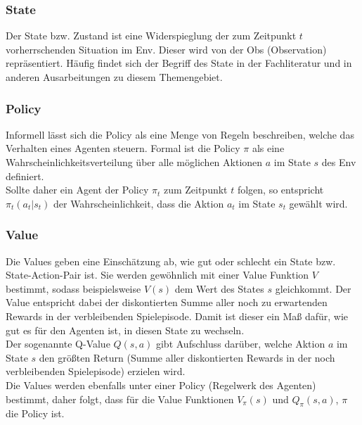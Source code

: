 \subsubsection{State} \label{subsubsec:Grundlagen_State}
Der State bzw. Zustand ist eine Widerspieglung der zum Zeitpunkt $t$ vorherrschenden Situation im Env. 
Dieser wird von der Obs (Observation) repräsentiert. Häufig findet sich der Begriff des State in der Fachliteratur und in anderen Ausarbeitungen zu diesem Themengebiet. \citep[s. 381 ff.]{Sutton1998}

\subsubsection{Policy} \label{subsubsec:Grundlagen_Policy}
Informell lässt sich die Policy als eine Menge von Regeln beschreiben, welche das Verhalten eines Agenten steuern. Formal ist die Policy $\pi$ als eine Wahrscheinlichkeitsverteilung über alle möglichen Aktionen $a$ im State $s$ des Env definiert. \citep[S. 44]{DRL_Lapan}\\
Sollte daher ein Agent der Policy $\pi_{t}$ zum Zeitpunkt $t$ folgen, so entspricht $\pi_{t}(a_t|s_t)$ der Wahrscheinlichkeit, dass die Aktion $a_t$ im State $s_t$ gewählt wird. \citep[S. 45 ff.]{Sutton1998}

\subsubsection{Value} \label{subsubsec:Grundlagen_Value}
Die Values geben eine Einschätzung ab, wie gut oder schlecht ein State bzw. State-Action-Pair ist. Sie werden gewöhnlich mit einer Value Funktion $V$ bestimmt, sodass beispielsweise $V(s)$ dem Wert des States $s$ gleichkommt. Der Value entspricht dabei der diskontierten Summe aller noch zu erwartenden Rewards in der verbleibenden Spielepisode. Damit ist dieser ein Maß dafür, wie gut es für den Agenten ist, in diesen State zu wechseln.\\
Der sogenannte Q-Value $Q(s,a)$ gibt Aufschluss darüber, welche Aktion $a$ im State $s$ den größten Return (Summe aller diskontierten Rewards in der noch verbleibenden Spielepisode) erzielen wird.\\
Die Values werden ebenfalls unter einer Policy (Regelwerk des Agenten) bestimmt, daher folgt, dass für die Value Funktionen $V_\pi(s)$ und $Q_\pi(s,a)$, $\pi$ die Policy ist. \citep[S. 46]{Sutton1998}


